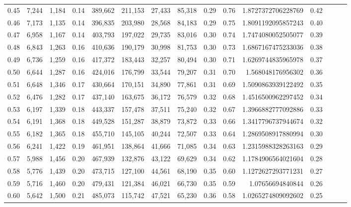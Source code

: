 \begin{tabular}{rrrrrrrrrrrrrrr}
0.45 &   7,244 &  1,184 &  0.14 &  389,662 &  211,153 &   27,433 &   85,318 &  0.29 &  0.76 &    1.8727372706228769 &      0.42 \\
0.46 &   7,173 &  1,135 &  0.14 &  396,835 &  203,980 &   28,568 &   84,183 &  0.29 &  0.75 &    1.8091192095857243 &      0.40 \\
0.47 &   6,958 &  1,167 &  0.14 &  403,793 &  197,022 &   29,735 &   83,016 &  0.30 &  0.74 &    1.7474080052505077 &      0.39 \\
0.48 &   6,843 &  1,263 &  0.16 &  410,636 &  190,179 &   30,998 &   81,753 &  0.30 &  0.73 &    1.6867167475233036 &      0.38 \\
0.49 &   6,736 &  1,259 &  0.16 &  417,372 &  183,443 &   32,257 &   80,494 &  0.30 &  0.71 &    1.6269744835965978 &      0.37 \\
0.50 &   6,644 &  1,287 &  0.16 &  424,016 &  176,799 &   33,544 &   79,207 &  0.31 &  0.70 &     1.568048176956302 &      0.36 \\
0.51 &   6,648 &  1,346 &  0.17 &  430,664 &  170,151 &   34,890 &   77,861 &  0.31 &  0.69 &    1.5090863939122492 &      0.35 \\
0.52 &   6,476 &  1,282 &  0.17 &  437,140 &  163,675 &   36,172 &   76,579 &  0.32 &  0.68 &    1.4516500962297452 &      0.34 \\
0.53 &   6,197 &  1,339 &  0.18 &  443,337 &  157,478 &   37,511 &   75,240 &  0.32 &  0.67 &    1.3966882777092886 &      0.33 \\
0.54 &   6,191 &  1,368 &  0.18 &  449,528 &  151,287 &   38,879 &   73,872 &  0.33 &  0.66 &    1.3417796737944674 &      0.32 \\
0.55 &   6,182 &  1,365 &  0.18 &  455,710 &  145,105 &   40,244 &   72,507 &  0.33 &  0.64 &    1.2869508917880994 &      0.30 \\
0.56 &   6,241 &  1,422 &  0.19 &  461,951 &  138,864 &   41,666 &   71,085 &  0.34 &  0.63 &    1.2315988328263163 &      0.29 \\
0.57 &   5,988 &  1,456 &  0.20 &  467,939 &  132,876 &   43,122 &   69,629 &  0.34 &  0.62 &    1.1784906564021604 &      0.28 \\
0.58 &   5,776 &  1,439 &  0.20 &  473,715 &  127,100 &   44,561 &   68,190 &  0.35 &  0.60 &    1.1272627293771231 &      0.27 \\
0.59 &   5,716 &  1,460 &  0.20 &  479,431 &  121,384 &   46,021 &   66,730 &  0.35 &  0.59 &      1.07656694840844 &      0.26 \\
0.60 &   5,642 &  1,500 &  0.21 &  485,073 &  115,742 &   47,521 &   65,230 &  0.36 &  0.58 &    1.0265274809092602 &      0.25 \\

\end{tabular}
